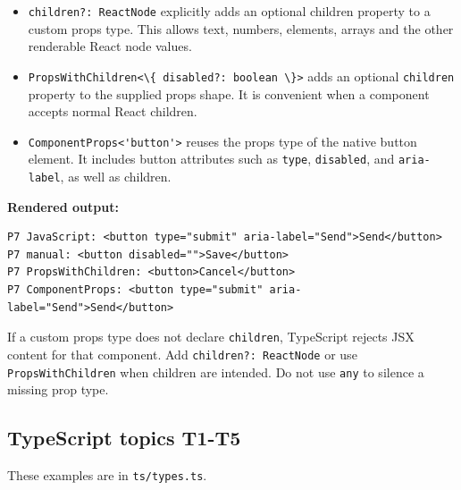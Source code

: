 \documentclass[
]{article}
\newcommand{\passthrough}[1]{#1}
\providecommand{\tightlist}{%
  \setlength{\itemsep}{0pt}\setlength{\parskip}{0pt}}
\begin{document}
\begin{itemize}
\tightlist
\item
  \passthrough{\lstinline!children?: ReactNode!} explicitly adds an
  optional children property to a custom props type. This allows text,
  numbers, elements, arrays and the other renderable React node values.
\item
  \passthrough{\lstinline!PropsWithChildren<\{ disabled?: boolean \}>!}
  adds an optional \passthrough{\lstinline!children!} property to the
  supplied props shape. It is convenient when a component accepts normal
  React children.
\item
  \passthrough{\lstinline!ComponentProps<'button'>!} reuses the props
  type of the native button element. It includes button attributes such
  as \passthrough{\lstinline!type!}, \passthrough{\lstinline!disabled!},
  and \passthrough{\lstinline!aria-label!}, as well as children.
\end{itemize}

\textbf{Rendered output:}

\begin{lstlisting}
P7 JavaScript: <button type="submit" aria-label="Send">Send</button>
P7 manual: <button disabled="">Save</button>
P7 PropsWithChildren: <button>Cancel</button>
P7 ComponentProps: <button type="submit" aria-label="Send">Send</button>
\end{lstlisting}

If a custom props type does not declare
\passthrough{\lstinline!children!}, TypeScript rejects JSX content for
that component. Add \passthrough{\lstinline!children?: ReactNode!} or
use \passthrough{\lstinline!PropsWithChildren!} when children are
intended. Do not use \passthrough{\lstinline!any!} to silence a missing
prop type.

\subsection{TypeScript topics T1-T5}\label{typescript-topics-t1-t5}

These examples are in \passthrough{\lstinline!ts/types.ts!}.
\end{document}
